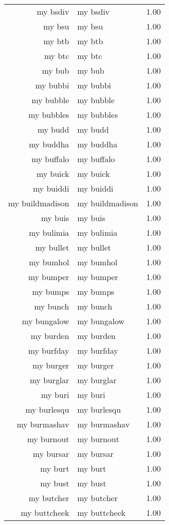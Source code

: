 \begin{table}[ht]
\begin{tabular}{rlr}
  my bsdiv & my bsdiv & 1.00 \\ 
  my bsu & my bsu & 1.00 \\ 
  my btb & my btb & 1.00 \\ 
  my btc & my btc & 1.00 \\ 
  my bub & my bub & 1.00 \\ 
  my bubbi & my bubbi & 1.00 \\ 
  my bubble & my bubble & 1.00 \\ 
  my bubbles & my bubbles & 1.00 \\ 
  my budd & my budd & 1.00 \\ 
  my buddha & my buddha & 1.00 \\ 
  my buffalo & my buffalo & 1.00 \\ 
  my buick & my buick & 1.00 \\ 
  my buiddi & my buiddi & 1.00 \\ 
  my buildmadison & my buildmadison & 1.00 \\ 
  my buis & my buis & 1.00 \\ 
  my bulimia & my bulimia & 1.00 \\ 
  my bullet & my bullet & 1.00 \\ 
  my bumhol & my bumhol & 1.00 \\ 
  my bumper & my bumper & 1.00 \\ 
  my bumps & my bumps & 1.00 \\ 
  my bunch & my bunch & 1.00 \\ 
  my bungalow & my bungalow & 1.00 \\ 
  my burden & my burden & 1.00 \\ 
  my burfday & my burfday & 1.00 \\ 
  my burger & my burger & 1.00 \\ 
  my burglar & my burglar & 1.00 \\ 
  my buri & my buri & 1.00 \\ 
  my burlesqu & my burlesqu & 1.00 \\ 
  my burmashav & my burmashav & 1.00 \\ 
  my burnout & my burnout & 1.00 \\ 
  my bursar & my bursar & 1.00 \\ 
  my burt & my burt & 1.00 \\ 
  my bust & my bust & 1.00 \\ 
  my butcher & my butcher & 1.00 \\ 
  my buttcheek & my buttcheek & 1.00 \\ 

\end{tabular}
\end{table}
